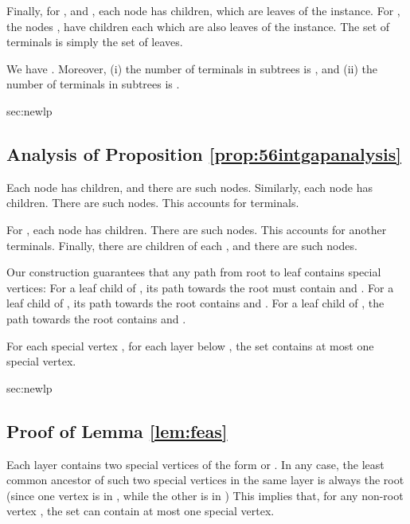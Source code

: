 Finally, for , and , each node  has  children, which are leaves of the instance.  
For , the nodes ,  have  children each which are also leaves of the instance. 
The set of terminals  is simply the set of leaves. 

\begin{proposition} 
We have .
Moreover, 
(i) the number of terminals in subtrees  is , and (ii) the number of terminals in subtrees  is .  
\label{prop:56intgapanalysis}
\end{proposition}  

\begin{appendixproof}{sec:newlp}{\subsection{Analysis of Proposition \ref{prop:56intgapanalysis}}}
Each node  has  children, and there are  such nodes. 
Similarly, each node  has  children. There are  such nodes. 
This accounts for  terminals. 

For , each node  has  children. 
There are  such nodes. 
This accounts for another  terminals. 
Finally, there are  children of each , and there are  such nodes. 



\end{appendixproof} 


\vspace{0.1in} 

Our construction guarantees that any path from root to leaf contains  special vertices: For a leaf child of , its path towards the root must contain  and . 
For a leaf child of , its path towards the root contains  and . 
For a leaf child of , the path towards the root contains  and .   

  


\begin{lemma}
\label{lem:feas}  
For each special vertex , for each layer  below , the set  contains at most one special vertex. 
\end{lemma} 

\begin{appendixproof}{sec:newlp}{\subsection{Proof of Lemma \ref{lem:feas}}}
Each layer contains two special vertices of the form  or .
In any case, the least common ancestor of such two special vertices in the same layer is always the root  (since one vertex is in , while the other is in )
This implies that, for any non-root vertex , the set  can contain at most one special vertex. 
\end{appendixproof}

